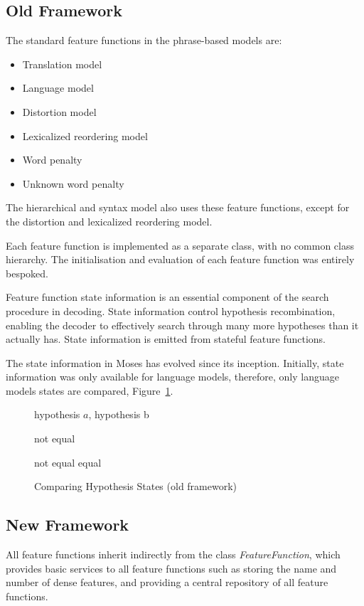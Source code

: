 \documentclass{pbml}
\begin{document}
\subsection{Old Framework}

The standard feature functions in the phrase-based models are:
\begin{itemize}
  \item Translation model
  \item Language model
  \item Distortion model
  \item Lexicalized reordering model
  \item Word penalty
  \item Unknown word penalty
\end{itemize}
The hierarchical and syntax model also uses these feature functions, except for the distortion and lexicalized reordering model.

Each feature function is implemented as a separate class, with no common class hierarchy. The initialisation and evaluation of each feature function was entirely bespoked.

Feature function state information is an essential component of the search procedure in decoding. State information control hypothesis recombination, enabling the decoder to effectively search through many more hypotheses than it actually has. State information is emitted from stateful feature functions.

The state information in Moses has evolved since its inception. Initially, state information was only available for language models, therefore, only language models states are compared, Figure~\ref{algo:CompareHypoStates}.

\begin{figure} [h!]
\small 
\begin{algorithmic}
\REQUIRE hypothesis $a$, hypothesis b

	\RETURN not equal
       \ENDIF
       
	    \RETURN not equal
	 \ENDIF
        \ENDFOR
        \RETURN equal

\end{algorithmic}
\caption{Comparing Hypothesis States (old framework)}
\label{algo:CompareHypoStates}
\end{figure} 

\subsection{New Framework}        
 All feature functions inherit indirectly from the class \emph{FeatureFunction}, which provides basic services to all feature functions such as storing the name and number of dense features, and providing a central repository of all feature functions.
\end{document}

